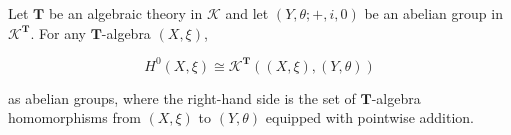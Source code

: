 Let $\mathbf{T}$ be an algebraic theory in $\mathcal{K}$ and let $(Y, \theta; +, i, 0)$ be an abelian group in $\mathcal{K}^{\mathbf{T}}$. For any $\mathbf{T}$-algebra $(X, \xi)$,

$$H^0(X, \xi) \cong \mathcal{K}^{\mathbf{T}}((X, \xi), (Y, \theta))$$

as abelian groups, where the right-hand side is the set of $\mathbf{T}$-algebra homomorphisms from $(X, \xi)$ to $(Y, \theta)$ equipped with pointwise addition.
